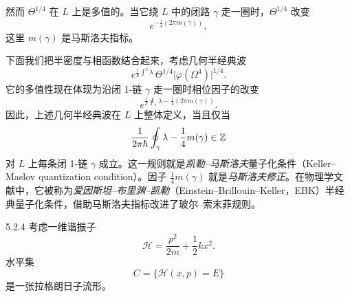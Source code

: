 然而 $\Theta^{1/4}$ 在 $L$ 上是多值的。当它绕 $L$ 中的闭路 $\gamma$ 走一圈时，$\Theta^{1/4}$ 改变
\[
e^{-\frac i4(2\pi m(\gamma))},
\]
这里 $m(\gamma)$ 是马斯洛夫指标。

下面我们把半密度与相函数结合起来，考虑几何半经典波
\[
e^{\frac i\hbar\int^z\lambda}\,\Theta^{1/4}\big|\varphi(\Omega^4)\big|^{1/4}.
\]
它的多值性现在体现为沿闭 1-链 $\gamma$ 走一圈时相位因子的改变
\[
e^{\frac i\hbar\oint_\gamma\lambda-\frac i4(2\pi m(\gamma))}.
\]
因此，上述几何半经典波在 $L$ 上整体定义，当且仅当
\[
\frac{1}{2\pi\hbar}\oint_\gamma\lambda-\frac14m(\gamma)\in\mathbb{Z}
\]
对 $L$ 上每条闭 1-链 $\gamma$ 成立。这一规则就是\emph{凯勒–马斯洛夫}量子化条件（Keller–Maslov quantization condition）。因子 $\frac14m(\gamma)$ 就是\emph{马斯洛夫修正}。在物理学文献中，它被称为\emph{爱因斯坦–布里渊–凯勒}（Einstein–Brillouin–Keller，EBK）半经典量子化条件，借助马斯洛夫指标改进了玻尔–索末菲规则。

\begin{example}{5.2.4}
考虑一维谐振子
\[
\mathcal{H}=\frac{p^2}{2m}+\frac12kx^2.
\]
水平集
\[
C=\{\mathcal{H}(x,p)=E\}
\]
是一张拉格朗日子流形。
\end{example}









